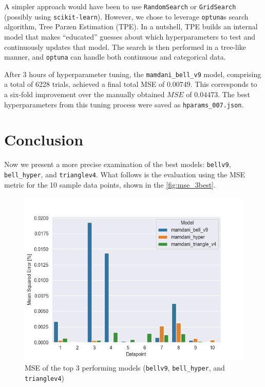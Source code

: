 \documentclass[titlepage]{article}
\newcommand*\apos{\textsc{\char13}}
\begin{document}
A simpler approach would have been to use \texttt{RandomSearch} or \texttt{GridSearch} (possibly using \texttt{scikit-learn}).
However, we chose to leverage \texttt{optuna}\apos s search algorithm, Tree Parzen Estimation (TPE).
In a nutshell, TPE builds an internal model that makes ``educated'' guesses about which hyperparameters to test and continuously updates that model.
The search is then performed in a tree-like manner, and \texttt{optuna} can handle both continuous and categorical data.

After 3 hours of hyperparameter tuning, the \texttt{mamdani\_bell\_v9} model, comprising a total of 6228 trials, achieved a final total MSE of $0.00749$.
This corresponds to a six-fold improvement over the manually obtained $MSE$ of $0.04473$.
The best hyperparameters from this tuning process were saved as \texttt{hparams\_007.json}.


\section{Conclusion}

Now we present a more precise examination of the best models: \texttt{bellv9}, \texttt{bell\_hyper}, and \texttt{trianglev4}.
What follows is the evaluation using the MSE metric for the 10 sample data points, shown in the \vref{fig:mse_3best}.

\begin{figure}[H]
\centering
\includegraphics[scale=0.5]{../images/eval_models/mse_3best}
\caption{MSE of the top 3 performing models (\texttt{bellv9}, \texttt{bell\_hyper}, and \texttt{trianglev4})}
\label{fig:mse_3best}
\end{figure}
\end{document}
